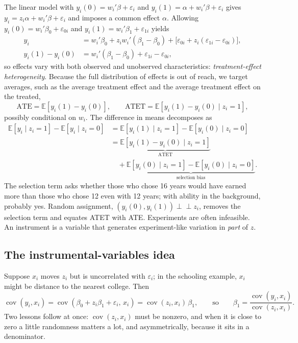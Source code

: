 \documentclass[11pt,a4paper]{article}
\newcommand{\E}{\mathbb{E}}
\newcommand{\Cov}{\operatorname{cov}}
\newcommand{\indep}{\perp\!\!\!\perp}
\begin{document}
The linear model with $y_i(0)=w_i'\beta+\varepsilon_i$ and $y_i(1)=\alpha+w_i'\beta+\varepsilon_i$ gives $y_i=z_i\alpha+w_i'\beta+\varepsilon_i$ and imposes a common effect $\alpha$. Allowing $y_i(0)=w_i'\beta_0+\varepsilon_{0i}$ and $y_i(1)=w_i'\beta_1+\varepsilon_{1i}$ yields
\begin{align*}
y_i&=w_i'\beta_0+z_iw_i'(\beta_1-\beta_0)+\big[\varepsilon_{0i}+z_i(\varepsilon_{1i}-\varepsilon_{0i})\big],\\
y_i(1)-y_i(0)&=w_i'(\beta_1-\beta_0)+\varepsilon_{1i}-\varepsilon_{0i},
\end{align*}
so effects vary with both observed and unobserved characteristics: \emph{treatment-effect heterogeneity}. Because the full distribution of effects is out of reach, we target averages, such as the average treatment effect and the average treatment effect on the treated,
\[
\text{ATE}=\E[y_i(1)-y_i(0)],\qquad\text{ATET}=\E[y_i(1)-y_i(0)\mid z_i=1],
\]
possibly conditional on $w_i$. The difference in means decomposes as
\begin{equation}\label{eq:selbias}
\begin{aligned}
\E[y_i\mid z_i=1]-\E[y_i\mid z_i=0]
&=\E[y_i(1)\mid z_i=1]-\E[y_i(0)\mid z_i=0]\\
&=\underbrace{\E[y_i(1)-y_i(0)\mid z_i=1]}_{\text{ATET}}\\
&\quad+\underbrace{\E[y_i(0)\mid z_i=1]-\E[y_i(0)\mid z_i=0]}_{\text{selection bias}} .
\end{aligned}
\end{equation}
The selection term asks whether those who chose 16 years would have earned more than those who chose 12 even with 12 years; with ability in the background, probably yes. Random assignment, $(y_i(0),y_i(1))\indep z_i$, removes the selection term and equates ATET with ATE. Experiments are often infeasible. An instrument is a variable that generates experiment-like variation in \emph{part} of $z$.

\subsection{The instrumental-variables idea}\label{sec:ividea}

Suppose $x_i$ moves $z_i$ but is uncorrelated with $\varepsilon_i$; in the schooling example, $x_i$ might be distance to the nearest college. Then
\[
\Cov(y_i,x_i)=\Cov(\beta_0+z_i\beta_1+\varepsilon_i,\,x_i)=\Cov(z_i,x_i)\,\beta_1,
\qquad\text{so}\qquad
\beta_1=\frac{\Cov(y_i,x_i)}{\Cov(z_i,x_i)} .
\]
Two lessons follow at once: $\Cov(z_i,x_i)$ must be nonzero, and when it is close to zero a little randomness matters a lot, and asymmetrically, because it sits in a denominator.
\end{document}
